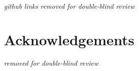 \documentclass[pldi]{sigplanconf-pldi15}
\begin{document}
{\em github links removed for double-blind review}
%

\section{Acknowledgements}

{\em removed for double-blind review}



{}
\end{document}
